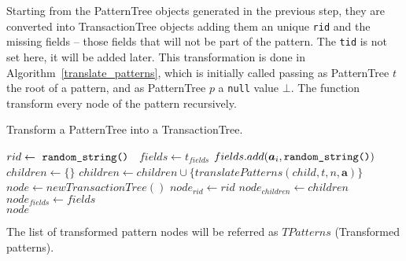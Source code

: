 \documentclass{acm_proc_article-sp-sigmod09}
\begin{document}
Starting from the PatternTree objects generated in the previous step, they are converted into TransactionTree objects adding them an unique \texttt{rid} and the missing fields -- those fields that will not be part of the pattern. The \texttt{tid} is not set here, it will be added later. This transformation is done in Algorithm~\ref{translate_patterns}, which is initially called passing as PatternTree $t$ the root of a pattern, and as PatternTree $p$ a \texttt{null} value $\bot$. The function transform every node of the pattern recursively.

\begin{algorithm}
\caption{Transform a PatternTree into a TransactionTree.}
\label{translate_patterns}
\begin{algorithmic}[1]
\State $rid \gets \text{ \texttt{random\_string() }}$
\State $fields \gets t_{fields}$
		\State $fields.add(\boldsymbol{a}_i, \text{\texttt{random\_string()}})$
	\EndIf
\EndFor
\State $children \gets \{\}$
	\State $children \gets children \cup \{translatePatterns(child, t, n, \boldsymbol{a})\}$
\EndFor
\State $node \gets new TransactionTree()$
\State $node_{rid} \gets rid$
\State $node_{children} \gets children$
\State $node_{fields} \gets fields$ \\
\Return $node$
\EndFunction
\end{algorithmic}
\end{algorithm}

The list of transformed pattern nodes will be referred as $TPatterns$ (Transformed patterns).
\end{document}
